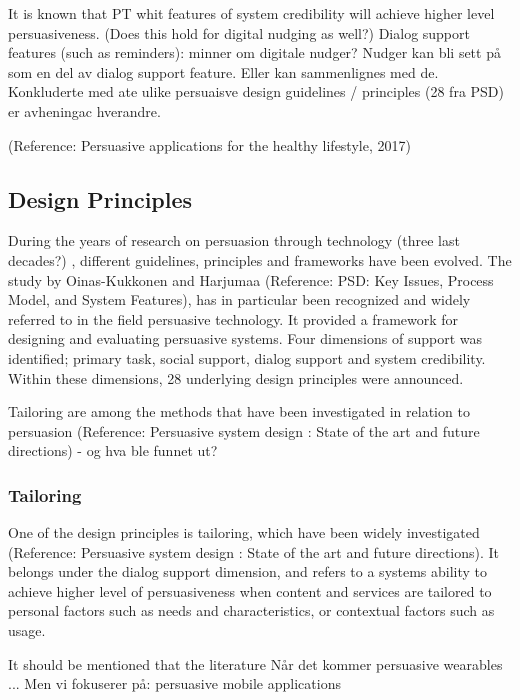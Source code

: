 It is known that PT whit features of system credibility will achieve higher level persuasiveness. (Does this hold for digital nudging as well?) 
Dialog support features (such as reminders): minner om digitale nudger? Nudger kan bli sett på som en del av dialog support feature. Eller kan sammenlignes med de. 
Konkluderte med ate ulike persuaisve design guidelines / principles (28 fra PSD) er avheningac hverandre. 

(Reference: Persuasive applications for the healthy lifestyle, 2017) 

\subsection{Design Principles}
During the years of research on persuasion through technology (three last decades?) , different guidelines, principles and frameworks have been evolved. The study by Oinas-Kukkonen and Harjumaa (Reference: PSD: Key Issues, Process Model, and System Features), has in particular been recognized and widely referred to in the field persuasive technology. It provided a framework for designing and evaluating persuasive systems. Four dimensions of support was identified; primary task, social support, dialog support and system credibility. Within these dimensions, 28 underlying design principles were announced. 

Tailoring are among the methods that have been investigated in relation to persuasion (Reference: Persuasive system design : State of the art and future directions) - og hva ble funnet ut?

\subsubsection{Tailoring}
One of the design principles is tailoring, which have been widely investigated (Reference: Persuasive system design : State of the art and future directions). It belongs under the dialog support dimension, and refers to a systems ability to achieve higher level of persuasiveness when content and services are tailored to personal factors such as needs and characteristics, or contextual factors such as usage. 

It should be mentioned that the literature 
Når det kommer persuasive wearables ... 
Men vi fokuserer på: persuasive mobile applications 

